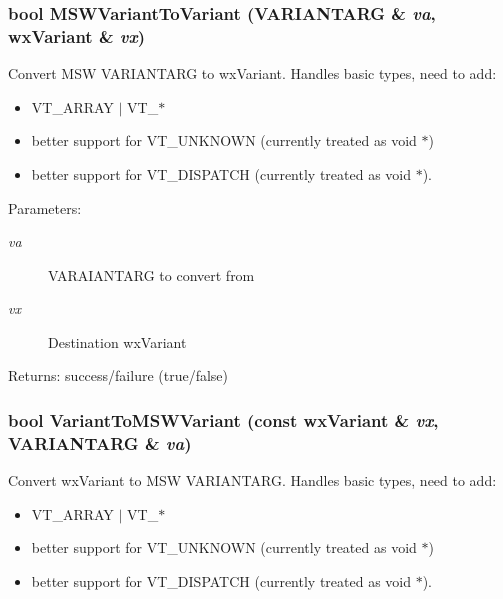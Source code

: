 \subsubsection{\setlength{\rightskip}{0pt plus 5cm}bool MSWVariant\-To\-Variant (VARIANTARG \& {\em va}, wx\-Variant \& {\em vx})\hspace{0.3cm}{\tt  [related]}}\label{classwxActiveX_k0}


Convert MSW VARIANTARG to wx\-Variant. Handles basic types, need to add:\begin{itemize}
\item VT\_\-ARRAY $|$ VT\_\-$\ast$\item better support for VT\_\-UNKNOWN (currently treated as void $\ast$)\item better support for VT\_\-DISPATCH (currently treated as void $\ast$).\end{itemize}


\begin{Desc}
\item[Parameters:]
\begin{description}
\item[{\em va}]VARAIANTARG to convert from \item[{\em vx}]Destination wx\-Variant \end{description}
\end{Desc}
\begin{Desc}
\item[Returns:]success/failure (true/false) \end{Desc}
\subsubsection{\setlength{\rightskip}{0pt plus 5cm}bool Variant\-To\-MSWVariant (const wx\-Variant \& {\em vx}, VARIANTARG \& {\em va})\hspace{0.3cm}{\tt  [related]}}\label{classwxActiveX_k1}


Convert wx\-Variant to MSW VARIANTARG. Handles basic types, need to add:\begin{itemize}
\item VT\_\-ARRAY $|$ VT\_\-$\ast$\item better support for VT\_\-UNKNOWN (currently treated as void $\ast$)\item better support for VT\_\-DISPATCH (currently treated as void $\ast$).\end{itemize}


